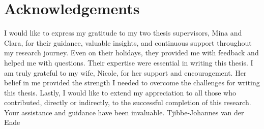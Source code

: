 \chapter*{Acknowledgements}

 I would like to express my gratitude to my two thesis supervisors, Mina and Clara, for their guidance, valuable insights, and continuous support throughout my research journey. Even on their holidays, they provided me with feedback and helped me with questions. Their expertise were essential in writing this thesis. \newline
I am truly grateful to my wife, Nicole, for her support and encouragement. 
Her belief in me provided the strength I needed to overcome the challenges for writing this thesis. \newline \newline
Lastly, I would like to extend my appreciation to all those who contributed, directly or indirectly, to the successful completion of this research. Your assistance and guidance have been invaluable. \newline \newline
Tjibbe-Johannes van der Ende